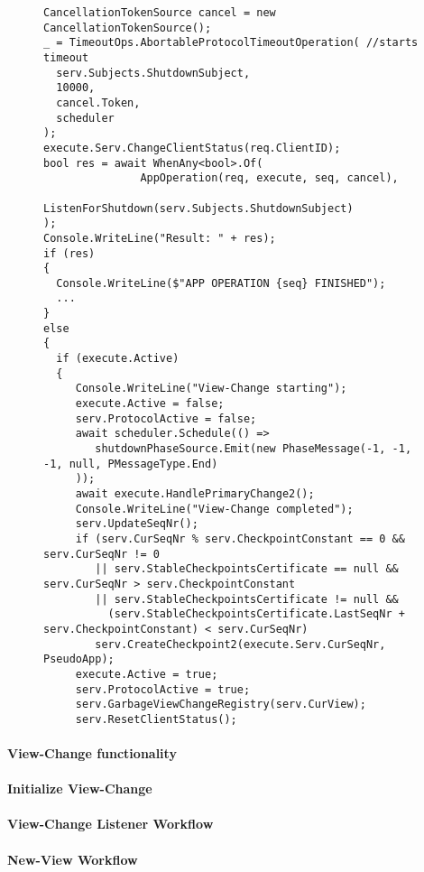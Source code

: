 \begin{figure}[H]
	\centering
	\begin{lstlisting}[label = code:timeout, caption=Handling timeout for the normal protocol workflow and initiate the View-Change process, captionpos = b, basicstyle=\scriptsize]
CancellationTokenSource cancel = new CancellationTokenSource();
_ = TimeoutOps.AbortableProtocolTimeoutOperation( //starts timeout
  serv.Subjects.ShutdownSubject,
  10000,
  cancel.Token,
  scheduler
);
execute.Serv.ChangeClientStatus(req.ClientID);
bool res = await WhenAny<bool>.Of(
               AppOperation(req, execute, seq, cancel),
               ListenForShutdown(serv.Subjects.ShutdownSubject)
);
Console.WriteLine("Result: " + res);
if (res)
{
  Console.WriteLine($"APP OPERATION {seq} FINISHED");
  ...
}
else
{
  if (execute.Active)
  {
     Console.WriteLine("View-Change starting");
     execute.Active = false;
     serv.ProtocolActive = false;
     await scheduler.Schedule(() =>
        shutdownPhaseSource.Emit(new PhaseMessage(-1, -1, -1, null, PMessageType.End)
     ));
     await execute.HandlePrimaryChange2();
     Console.WriteLine("View-Change completed");
     serv.UpdateSeqNr();
     if (serv.CurSeqNr % serv.CheckpointConstant == 0 && serv.CurSeqNr != 0
        || serv.StableCheckpointsCertificate == null && serv.CurSeqNr > serv.CheckpointConstant
        || serv.StableCheckpointsCertificate != null &&
          (serv.StableCheckpointsCertificate.LastSeqNr + serv.CheckpointConstant) < serv.CurSeqNr)
        serv.CreateCheckpoint2(execute.Serv.CurSeqNr, PseudoApp);
     execute.Active = true;
     serv.ProtocolActive = true;
     serv.GarbageViewChangeRegistry(serv.CurView);
     serv.ResetClientStatus();
   \end{lstlisting}
\end{figure}


\paragraph{View-Change functionality}

\paragraph{Initialize View-Change}
\paragraph{View-Change Listener Workflow}
\label{sec:viewchangeListener}
\paragraph{New-View Workflow}

